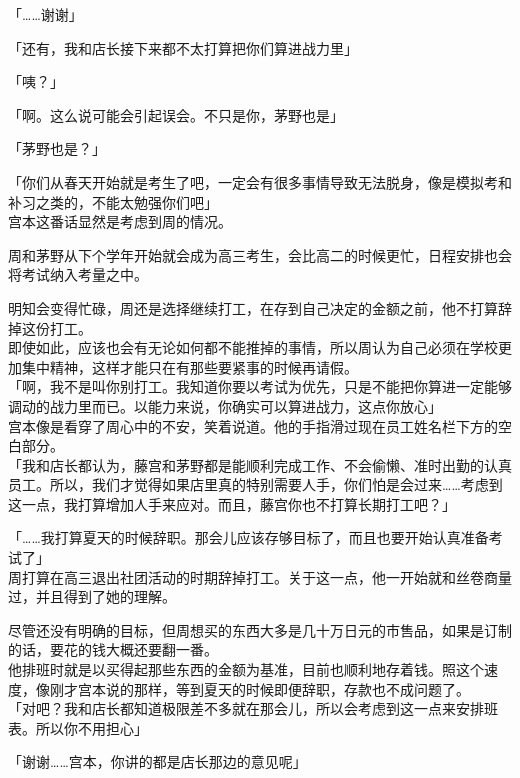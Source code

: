 「……谢谢」

「还有，我和店长接下来都不太打算把你们算进战力里」

「咦？」

「啊。这么说可能会引起误会。不只是你，茅野也是」

「茅野也是？」

「你们从春天开始就是考生了吧，一定会有很多事情导致无法脱身，像是模拟考和补习之类的，不能太勉强你们吧」\\

宫本这番话显然是考虑到周的情况。

周和茅野从下个学年开始就会成为高三考生，会比高二的时候更忙，日程安排也会将考试纳入考量之中。

明知会变得忙碌，周还是选择继续打工，在存到自己决定的金额之前，他不打算辞掉这份打工。\\

即使如此，应该也会有无论如何都不能推掉的事情，所以周认为自己必须在学校更加集中精神，这样才能只在有那些要紧事的时候再请假。\\

「啊，我不是叫你别打工。我知道你要以考试为优先，只是不能把你算进一定能够调动的战力里而已。以能力来说，你确实可以算进战力，这点你放心」\\

宫本像是看穿了周心中的不安，笑着说道。他的手指滑过现在员工姓名栏下方的空白部分。\\

「我和店长都认为，藤宫和茅野都是能顺利完成工作、不会偷懒、准时出勤的认真员工。所以，我们才觉得如果店里真的特别需要人手，你们怕是会过来……考虑到这一点，我打算增加人手来应对。而且，藤宫你也不打算长期打工吧？」

「……我打算夏天的时候辞职。那会儿应该存够目标了，而且也要开始认真准备考试了」\\

周打算在高三退出社团活动的时期辞掉打工。关于这一点，他一开始就和丝卷商量过，并且得到了她的理解。

尽管还没有明确的目标，但周想买的东西大多是几十万日元的市售品，如果是订制的话，要花的钱大概还要翻一番。\\

他排班时就是以买得起那些东西的金额为基准，目前也顺利地存着钱。照这个速度，像刚才宫本说的那样，等到夏天的时候即便辞职，存款也不成问题了。\\

「对吧？我和店长都知道极限差不多就在那会儿，所以会考虑到这一点来安排班表。所以你不用担心」

「谢谢……宫本，你讲的都是店长那边的意见呢」


